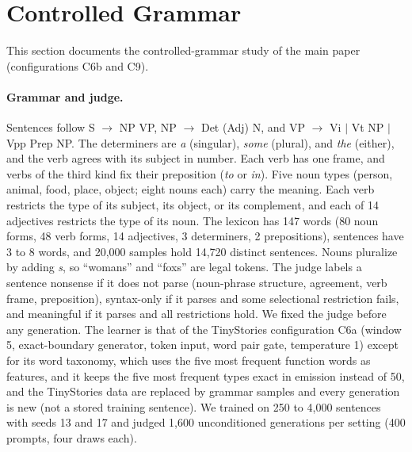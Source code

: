 \documentclass[11pt,letterpaper]{article}
\begin{document}
\section{Controlled Grammar}

This section documents the controlled-grammar study of the main paper (configurations C6b and C9).

\paragraph{Grammar and judge.} Sentences follow S $\to$ NP VP, NP $\to$ Det (Adj) N, and VP $\to$ Vi $\mid$ Vt NP $\mid$ Vpp Prep NP.
The determiners are \textit{a} (singular), \textit{some} (plural), and \textit{the} (either), and the verb agrees with its subject in number. Each verb has one frame, and verbs of the third kind fix their preposition (\textit{to} or \textit{in}).
Five noun types (person, animal, food, place, object; eight nouns each) carry the meaning. Each verb restricts the type of its subject, its object, or its complement, and each of 14 adjectives restricts the type of its noun.
The lexicon has 147 words (80 noun forms, 48 verb forms, 14 adjectives, 3 determiners, 2 prepositions), sentences have 3 to 8 words, and 20,000 samples hold 14,720 distinct sentences. Nouns pluralize by adding \textit{s}, so ``womans'' and ``foxs'' are legal tokens.
The judge labels a sentence nonsense if it does not parse (noun-phrase structure, agreement, verb frame, preposition), syntax-only if it parses and some selectional restriction fails, and meaningful if it parses and all restrictions hold.
We fixed the judge before any generation. The learner is that of the TinyStories configuration C6a (window 5, exact-boundary generator, token input, word pair gate, temperature 1) except for its word taxonomy, which uses the five most frequent function words as features, and it keeps the five most frequent types exact in emission instead of 50, and the TinyStories data are replaced by grammar samples and every generation is new (not a stored training sentence).
We trained on 250 to 4,000 sentences with seeds 13 and 17 and judged 1,600 unconditioned generations per setting (400 prompts, four draws each).
\end{document}
